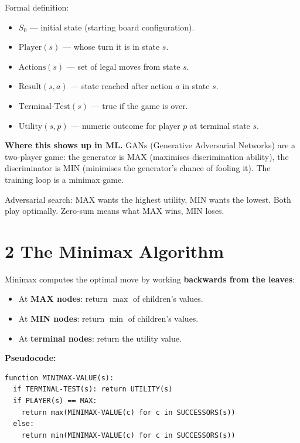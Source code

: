 \documentclass[a4paper,11pt]{article}
\begin{document}
Formal definition:
\begin{itemize}
  \item $S_0$ — initial state (starting board configuration).
  \item $\text{Player}(s)$ — whose turn it is in state $s$.
  \item $\text{Actions}(s)$ — set of legal moves from state $s$.
  \item $\text{Result}(s, a)$ — state reached after action $a$ in state $s$.
  \item $\text{Terminal-Test}(s)$ — true if the game is over.
  \item $\text{Utility}(s, p)$ — numeric outcome for player $p$ at terminal state $s$.
\end{itemize}

\textbf{Where this shows up in ML.} GANs (Generative Adversarial Networks) are a two-player game: the generator is MAX (maximises discrimination ability), the discriminator is MIN (minimises the generator's chance of fooling it). The training loop is a minimax game.

\begin{keytake}
Adversarial search: MAX wants the highest utility, MIN wants the lowest. Both play optimally. Zero-sum means what MAX wins, MIN loses.
\end{keytake}

\section{2 \quad The Minimax Algorithm}

Minimax computes the optimal move by working \textbf{backwards from the leaves}:
\begin{itemize}
  \item At \textbf{MAX nodes}: return $\max$ of children's values.
  \item At \textbf{MIN nodes}: return $\min$ of children's values.
  \item At \textbf{terminal nodes}: return the utility value.
\end{itemize}

\textbf{Pseudocode:}
\begin{verbatim}
function MINIMAX-VALUE(s):
  if TERMINAL-TEST(s): return UTILITY(s)
  if PLAYER(s) == MAX:
    return max(MINIMAX-VALUE(c) for c in SUCCESSORS(s))
  else:
    return min(MINIMAX-VALUE(c) for c in SUCCESSORS(s))
\end{verbatim}
\end{document}
